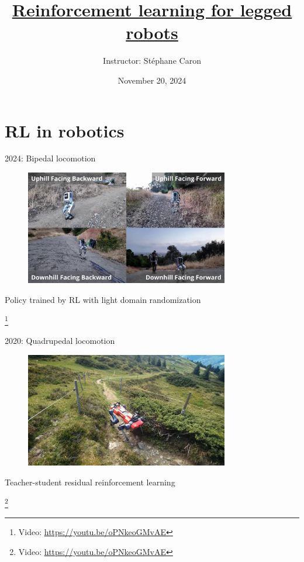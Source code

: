\documentclass[10pt, aspectratio=1610]{beamer}
\title{\href{https://www.master-mva.com/cours/robotics/}{Reinforcement learning for legged robots}}
\author{Instructor: {St\'ephane Caron}}
\date{November 20, 2024}
\institute{\href{https://www.inria.fr/en}{Inria}, \href{https://www.ens.psl.eu/en}{\'{E}cole normale sup\'{e}rieure}}
\newcommand\blfootnote[1]{%
  \begingroup
  \renewcommand\thefootnote{}%
  \footnote{#1}%
  \addtocounter{footnote}{-1}%
  \endgroup
}
\begin{document}
\maketitle


\section*{RL in robotics}

\begin{frame}{2024: Bipedal locomotion}
    \vspace{1.5em}
    \begin{figure}
        \includegraphics[height=5cm]{figures/2024-berkeley-humanoid.jpg}
    \end{figure}
    \begin{center}
        Policy trained by RL with light domain randomization~\cite{liao2024berkeley}
    \end{center}
    \blfootnote{Video: \url{https://youtu.be/oPNkeoGMvAE}}
\end{frame}

\begin{frame}{2020: Quadrupedal locomotion}
    \vspace{1.5em}
    \begin{figure}
        \includegraphics[height=5cm]{figures/2020-hike-with-anymal.jpg}
    \end{figure}
    \begin{center}
        Teacher-student residual reinforcement learning~\cite{lee2020}
    \end{center}
    \blfootnote{Video: \url{https://youtu.be/oPNkeoGMvAE}}
\end{frame}
\end{document}
